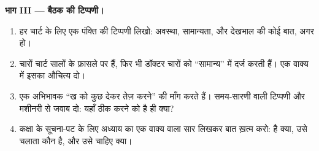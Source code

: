 \begin{problem}[{सप्ताहांत समस्या --- चार (कल्पित) वृद्धि-चार्ट, पूरे
अध्याय के साथ पढ़े हुए}]
\medskip\noindent\textbf{भाग III --- बैठक की टिप्पणी।}
\begin{enumerate}[resume]
  \item हर चार्ट के लिए एक पंक्ति की टिप्पणी लिखो: अवस्था,
        सामान्यता, और देखभाल की कोई बात, अगर हो।
  \item चारों चार्ट सालों के फ़ासले पर हैं, फिर भी डॉक्टर चारों को
        ``सामान्य'' में दर्ज करती हैं। एक वाक्य में इसका औचित्य दो।
  \item एक अभिभावक ``ख को कुछ देकर तेज़ करने'' की माँग करते हैं।
        समय-सारणी वाली टिप्पणी और मशीनरी से जवाब दो: यहाँ ठीक करने
        को है ही क्या?
  \item कक्षा के सूचना-पट के लिए अध्याय का एक वाक्य वाला सार लिखकर
        बात ख़त्म करो:  है क्या, उसे चलाता कौन है, और उसे
        चाहिए क्या।
\end{enumerate}
\end{problem}
